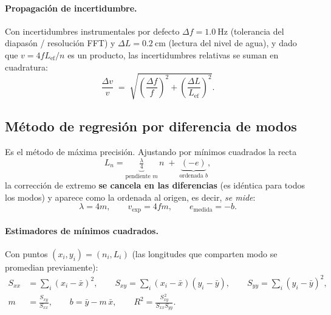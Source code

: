 \documentclass[11pt,a4paper]{article}
\newcommand{\vexp}{v_{\text{exp}}}
\newcommand{\Lef}{L_{\text{ef}}}
\begin{document}
\paragraph{Propagación de incertidumbre.} Con incertidumbres instrumentales por defecto
$\Delta f = \SI{1.0}{\hertz}$ (tolerancia del diapasón / resolución FFT) y
$\Delta L = \SI{0.2}{\centi\metre}$ (lectura del nivel de agua), y dado que
$v = 4 f \Lef / n$ es un producto, las incertidumbres relativas se suman en cuadratura:
\begin{equation}
  \frac{\Delta v}{v} \;=\;
  \sqrt{\left(\frac{\Delta f}{f}\right)^{2} +
        \left(\frac{\Delta L}{\Lef}\right)^{2}} .
  \label{eq:propagacion}
\end{equation}

\subsection{Método de regresión por diferencia de modos}
\label{sec:regresion}

Es el método de máxima precisión. Ajustando por mínimos cuadrados la recta
\begin{equation}
  L_n = \underbrace{\tfrac{\lambda}{4}}_{\text{pendiente }m}\, n \;+\;
        \underbrace{(-e)}_{\text{ordenada }b},
\end{equation}
la corrección de extremo \textbf{se cancela en las diferencias} (es idéntica para todos los
modos) y aparece como la ordenada al origen, es decir, \emph{se mide}:
\begin{equation}
  \lambda = 4m, \qquad \vexp = 4 f m, \qquad e_{\text{medida}} = -b .
\end{equation}

\paragraph{Estimadores de mínimos cuadrados.} Con puntos $(x_i, y_i) = (n_i, L_i)$
(las longitudes que comparten modo se promedian previamente):
\begin{align}
  S_{xx} &= \sum_i (x_i - \bar{x})^2, \qquad
  S_{xy} = \sum_i (x_i - \bar{x})(y_i - \bar{y}), \qquad
  S_{yy} = \sum_i (y_i - \bar{y})^2, \\
  m &= \frac{S_{xy}}{S_{xx}}, \qquad
  b = \bar{y} - m\,\bar{x}, \qquad
  R^2 = \frac{S_{xy}^{\,2}}{S_{xx} S_{yy}} .
\end{align}
\end{document}
